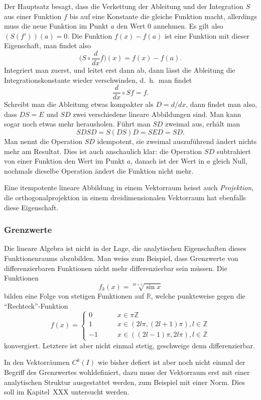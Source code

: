 Der Hauptsatz besagt, dass  die Verkettung der Ableitung und der Integration
$S$ aus einer Funktion $f$ bis auf eine Konstante die gleiche Funktion
macht, allerdings muss die neue Funktion im Punkt $a$ den Wert $0$ annehmen.
Es gilt also $ (S(f'))(a) = 0 $.
Die Funktion $f(x)-f(a)$ ist eine Funktion mit dieser Eigenschaft, man findet
also
\[
\biggl(S\circ \frac{d}{dx} f\biggr) (x)
=
f(x)-f(a).
\]
Integriert man zuerst, und leitet erst dann ab, dann lässt die Ableitung
die Integrationskonstante wieder verschwinden, d.~h.~man findet
\[
\frac{d}{dx}\circ S f = f.
\]
Schreibt man die Ableitung etwas kompakter als $D=d/dx$, dann findet man
also, dass
$DS=E$ und $SD$ zwei verschiedene lineare Abbildungen sind.
Man kann sogar noch etwas mehr herausholen.
Führt man $SD$ zweimal aus, erhält man
\[
SDSD = S(DS)D=SED=SD.
\]
Man nennt die Operation $SD$ idempotent, sie zweimal auszuführend ändert
nichts mehr am Resultat.
Dies ist auch anschaulich klar: die Operation $SD$ subtrahiert von einer
Funktion den Wert im Punkt $a$, danach ist der Wert in $a$ gleich Null,
nochmals dieselbe Operation ändert die Funktion nicht mehr.

Eine itempotente lineare Abbildung in einem Vektorraum heisst auch
{\em Projektion},
%
die orthogonalprojektion in einem dreidimensionalen Vektorraum hat
ebenfalls diese Eigenschaft.

\subsubsection{Grenzwerte}
Die lineare Algebra ist nicht in der Lage, die analytischen Eigenschaften
dieses Funktionenraums abzubilden.
Man weiss zum Beispiel, dass Grenzwerte von differenzierbaren Funktionen
nicht mehr differenzierbar sein müssen.
Die Funktionen 
\[
f_k(x) = \sqrt[2k+1]{\sin x}
\]
bilden eine Folge von stetigen Funktionen auf $\mathbb R$, welche
punkteweise gegen die ``Rechteck''-Funktion
\[
f(x)=\begin{cases}
 0&\qquad x\in \pi\mathbb Z \\
 1&\qquad x\in (2l\pi, (2l+1)\pi), l\in\mathbb Z\\
-1&\qquad x\in ((2l-1)\pi, 2l\pi), l\in\mathbb Z
\end{cases}
\]
konvergiert.
Letztere ist aber nicht einmal stetig, geschweige denn differenzierbar.

In den Vektorräumen $C^k(I)$ wie bisher defiert ist aber noch nicht
einmal der Begriff des Grenzwertes wohldefiniert, dazu muss der
Vektorraum erst mit einer analytischen Struktur ausgestattet werden,
zum Beispiel mit einer Norm.
Dies soll im Kapitel~XXX untersucht werden.

